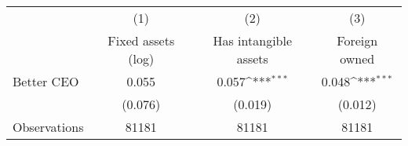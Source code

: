 {
\def\sym#1{\ifmmode^{#1}\else\(^{#1}\)\fi}
\begin{tabular}{l*{3}{c}}
\hline\hline
                    &\multicolumn{1}{c}{(1)}&\multicolumn{1}{c}{(2)}&\multicolumn{1}{c}{(3)}\\
                    &\multicolumn{1}{c}{Fixed assets (log)}&\multicolumn{1}{c}{Has intangible assets}&\multicolumn{1}{c}{Foreign owned}\\
\hline
Better CEO          &       0.055         &       0.057\sym{***}&       0.048\sym{***}\\
                    &     (0.076)         &     (0.019)         &     (0.012)         \\
\hline
Observations        &       81181         &       81181         &       81181         \\
\hline\hline
\end{tabular}
}
